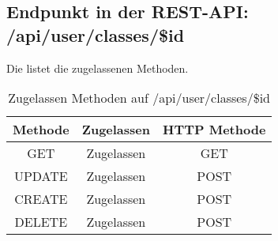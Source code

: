 \subsection{Endpunkt in der REST-API: /api/user/classes/\$id}
Die  listet die zugelassenen Methoden. 

\begin{table}[!htbp]
	\begin{tabular}{|c|c|c|}
		\hline
			\textbf{Methode} & \textbf{Zugelassen} & \textbf{HTTP Methode} \\ \hline
			GET & Zugelassen & GET \\ \hline
			UPDATE & Zugelassen & POST \\ \hline 
			CREATE & Zugelassen & POST \\ \hline 
			DELETE & Zugelassen & POST \\ \hline
	\end{tabular}

		\caption{Zugelassen Methoden auf /api/user/classes/\$id}
		\label{tab:end:rest:api:user:classes:id:meth}
\end{table}